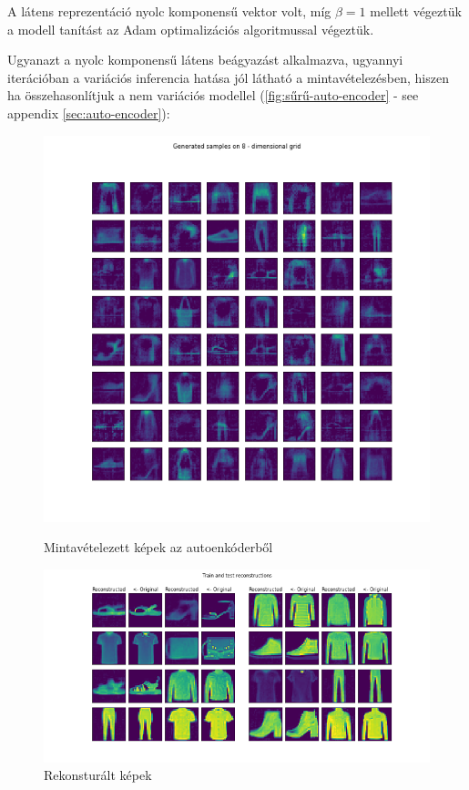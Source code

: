 \documentclass[12pt, english]{article}
\begin{document}
\vspace{4mm}

\par A látens reprezentáció nyolc komponensű vektor volt, míg $\beta = 1$ mellett végeztük a modell tanítást az Adam \cite{kingma2014adam} optimalizációs algoritmussal végeztük.
\vspace{4mm}

\par Ugyanazt a nyolc komponensű látens beágyazást alkalmazva, ugyannyi iterációban a variációs inferencia hatása jól látható a mintavételezésben, hiszen ha összehasonlítjuk a nem variációs modellel (\ref{fig:sűrű-auto-encoder} - see appendix \ref{sec:auto-encoder}):

\begin{figure}[ht] 
  \label{fig:auto_encoder_results} 
  \begin{minipage}{0.5\linewidth}
    \centering
    \includegraphics[width=.65\linewidth]{gen/generated_samples_fashion_mnist_auto_encoder.png} 
    \caption{Mintavételezett képek az autoenkóderből} 
  \end{minipage}%
  \begin{minipage}{0.5\linewidth}
    \centering
    \includegraphics[width=.95\linewidth]{reco/reconstrunction_samples_fashion_mnist_auto_encoder.png} 
    \caption{Rekonsturált képek} 
  \end{minipage} 
\end{figure}
\end{document}
